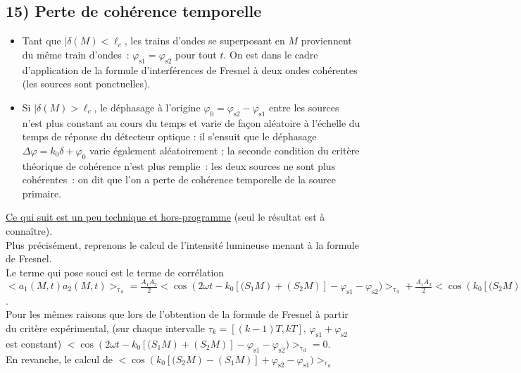 \documentclass{article}
\begin{document}
\subsection*{15) Perte de cohérence temporelle}
\begin{itemize}
\item Tant que $|\delta(M) < \ell_{c}$, les trains d'ondes se
superposant en $M$ proviennent du même train d'ondes : $\varphi_{\mathrm{s1}}
= \varphi_{\mathrm{s2}}$ pour tout $t$. On est dans le cadre d'application de
la formule d'interférences de Fresnel à deux ondes cohérentes (les
sources sont ponctuelles).
\item Si $|\delta(M) > \ell_{c}$, le
déphasage à l'origine $\varphi_{0} = \varphi_{\mathrm{s2}}-\varphi_{\mathrm{s1}}$
entre les sources n'est plus constant au cours du temps et varie de
façon aléatoire à l'échelle du temps de réponse du détecteur optique
: il s'ensuit que le déphasage $\Delta \varphi = k_{0}\delta
+\varphi_{0}$ varie également aléatoirement ; la seconde condition
du critère théorique de cohérence n'est plus remplie : les deux
sources ne sont plus cohérentes : on dit que l'on a perte de
cohérence temporelle de la source primaire.
\end{itemize}
\underline{Ce qui suit est un peu technique et hors-programme} (seul
le résultat
est à connaître). \\
Plus précisément, reprenons le calcul de l'intensité lumineuse
menant à la formule de Fresnel. \\
Le terme qui pose souci est le terme de corrélation \\
$<a_{1}(M,t)a_{2}(M,t)>_{\mathrm{\tau_{\mathrm{d}}}} =
\frac{A_{1}A_{2}}{2}<\cos\left(2\omega
t-k_{0}\left[(S_{1}M\right)+\left(S_{2}M\right)\right]-\varphi_{\mathrm{s1}}-\varphi_{\mathrm{s2}})>_{\mathrm{\tau_{\mathrm{d}}}} +
\frac{A_{1}A_{2}}{2}<\cos\left(k_{0}\left[(S_{2}M\right)-\left(S_{1}M\right)\right]+\varphi_{\mathrm{s2}}-\varphi_{\mathrm{s1}})>_{\mathrm{\tau_{\mathrm{d}}}}$.
\\
Pour les mêmes raisons que lors de l'obtention de la formule de
Fresnel à partir du critère expérimental, (sur chaque intervalle
$\tau_{k} = \left[(k-1)T,kT\right]$, $\varphi_{\mathrm{s1}}+\varphi_{\mathrm{s2}}$ est constant)
$<\cos\left(2\omega
t-k_{0}\left[(S_{1}M\right)+\left(S_{2}M\right)\right]-\varphi_{\mathrm{s1}}-\varphi_{\mathrm{s2}})>_{\mathrm{\tau_{\mathrm{d}}}} =
0$. \\
En revanche, le calcul de
$<\cos\left(k_{0}\left[(S_{2}M\right)-\left(S_{1}M\right)\right]+\varphi_{\mathrm{s2}}-\varphi_{\mathrm{s1}})>_{\mathrm{\tau_{\mathrm{d}}}}$
\end{document}
